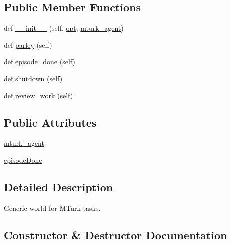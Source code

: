 \subsection*{Public Member Functions}
\begin{DoxyCompactItemize}
\item 
def \hyperlink{classparlai_1_1mturk_1_1core_1_1worlds_1_1MTurkTaskWorld_a7aee41b0411b618882dbad31b8c6209a}{\+\_\+\+\_\+init\+\_\+\+\_\+} (self, \hyperlink{classparlai_1_1core_1_1worlds_1_1World_a3640d92718acd3e6942a28c1ab3678bd}{opt}, \hyperlink{classparlai_1_1mturk_1_1core_1_1worlds_1_1MTurkTaskWorld_ae9fb1250e0b9a2f77efa255458e47fb3}{mturk\+\_\+agent})
\item 
def \hyperlink{classparlai_1_1mturk_1_1core_1_1worlds_1_1MTurkTaskWorld_aafb537fad9c12b4371599b0559d37c42}{parley} (self)
\item 
def \hyperlink{classparlai_1_1mturk_1_1core_1_1worlds_1_1MTurkTaskWorld_a9199b698134e0b6e83951ef10b9b25be}{episode\+\_\+done} (self)
\item 
def \hyperlink{classparlai_1_1mturk_1_1core_1_1worlds_1_1MTurkTaskWorld_a4c084c5ba931d4c241fc6f4046a8c5e8}{shutdown} (self)
\item 
def \hyperlink{classparlai_1_1mturk_1_1core_1_1worlds_1_1MTurkTaskWorld_ac601ef19c221a1ec43ecbaa322ff67a4}{review\+\_\+work} (self)
\end{DoxyCompactItemize}
\subsection*{Public Attributes}
\begin{DoxyCompactItemize}
\item 
\hyperlink{classparlai_1_1mturk_1_1core_1_1worlds_1_1MTurkTaskWorld_ae9fb1250e0b9a2f77efa255458e47fb3}{mturk\+\_\+agent}
\item 
\hyperlink{classparlai_1_1mturk_1_1core_1_1worlds_1_1MTurkTaskWorld_ab54f79ffe393a5c0bb185f61e5809522}{episode\+Done}
\end{DoxyCompactItemize}


\subsection{Detailed Description}
\begin{DoxyVerb}Generic world for MTurk tasks.
\end{DoxyVerb}
 

\subsection{Constructor \& Destructor Documentation}
\mbox{\label{classparlai_1_1mturk_1_1core_1_1worlds_1_1MTurkTaskWorld_a7aee41b0411b618882dbad31b8c6209a}} 
